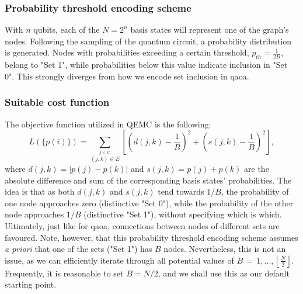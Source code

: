 \subsubsection*{\small Probability threshold encoding scheme}
With $n$ qubits, each of the $N = 2^{n}$ basis states will represent one of the graph's nodes. Following the sampling of the quantum circuit, a probability distribution is generated. Nodes with probabilities exceeding a certain threshold, $p_{th} = \frac{1}{2B}$, belong to "Set 1", while probabilities below this value indicate inclusion in "Set 0". This strongly diverges from how we encode set inclusion in \acrshort{qaoa}.

\subsubsection*{\small Suitable cost function}
The objective function utilized in QEMC is the following:
\begin{equation}
L(\{p(i)\}) = \sum_{\stackrel{j < k:}{(j,k)\in E}}\left[\left(d(j,k)-\frac{1}{B}\right)^{2}+\left(s(j,k)-\frac{1}{B}\right)^{2}\right],
\end{equation}
where $d(j,k) = |p(j) - p(k)|$ and $s(j, k) = p(j) + p(k)$ are the absolute difference and sum of the corresponding basis states' probabilities. The idea is that as both $d(j, k)$ and $s(j, k)$ tend towards $1/B$, the probability of one node approaches zero (distinctive "Set 0"), while the probability of the other node approaches $1/B$ (distinctive "Set 1"), without specifying which is which. Ultimately, just like for \acrshort{qaoa}, connections between nodes of different sets are favoured. Note, however, that this probability threshold encoding scheme assumes \textit{a priori} that one of the sets ("Set 1") has $B$ nodes. Nevertheless, this is not an issue, as we can efficiently iterate through all potential values of $B\,=\,1,...,\left\lfloor{\frac{N}{2}}\right\rfloor$. Frequently, it is reasonable to set $B = N/2$, and we shall use this as our default starting point.

